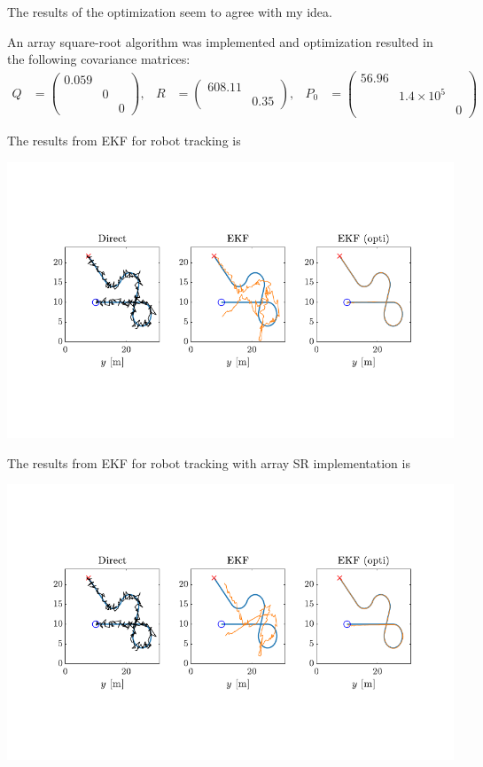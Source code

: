 The results of the optimization seem to agree with my idea.

An array square-root algorithm was implemented and optimization resulted in the following covariance matrices:
\begin{align*}
    Q &= \begin{pmatrix}
        0.059 & & \\ & 0 & \\ & & 0
    \end{pmatrix}, & 
    R &= \begin{pmatrix}
        608.11 & \\ & 0.35
    \end{pmatrix}, & 
    P_0 &= \begin{pmatrix}
        56.96 & & \\ & 1.4\times10^5 & \\ & & 0
    \end{pmatrix}
\end{align*}

\newpage

The results from EKF for robot tracking is 

\includegraphics{figures/EKF_Le3.pdf}

The results from EKF for robot tracking with array SR implementation is 

\includegraphics{figures/EKF_Le3_SR.pdf}

